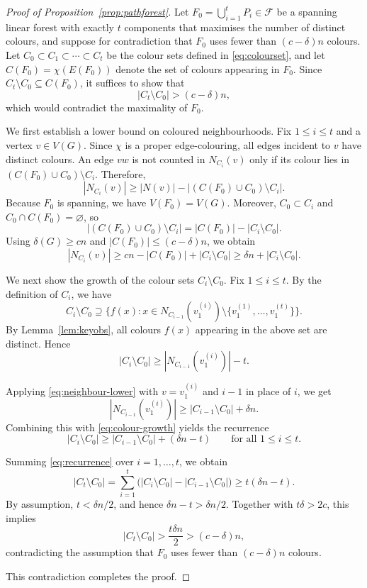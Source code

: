 \documentclass[10pt,a4paper]{amsart}
\renewcommand\ge{\geqslant}
\renewcommand\le{\leqslant}
\begin{document}
\begin{proof}[Proof of Proposition~\ref{prop:pathforest}]
Let $F_0=\bigcup_{i=1}^t P_i\in\mathcal F$ be a spanning linear forest with exactly $t$
components that maximises the number of distinct colours, and suppose for
contradiction that $F_0$ uses fewer than $(c-\delta)n$ colours.
Let $C_0\subset C_1\subset\cdots\subset C_t$ be the colour sets defined in
\eqref{eq:colourset}, and let $C(F_0)=\chi(E(F_0))$ denote the set of colours appearing
in $F_0$.
Since $C_t\setminus C_0\subseteq C(F_0)$, it suffices to show that
\[
|C_t\setminus C_0|>(c-\delta)n,
\]
which would contradict the maximality of $F_0$.

We first establish a lower bound on coloured neighbourhoods. Fix $1\le i\le t$ and a vertex $v\in V(G)$.
Since $\chi$ is a proper edge-colouring, all edges incident to $v$ have distinct
colours.
An edge $vw$ is not counted in $N_{C_i}(v)$ only if its colour lies in
$(C(F_0)\cup C_0)\setminus C_i$.
Therefore,
\[
|N_{C_i}(v)|
\ge |N(v)| - |(C(F_0)\cup C_0)\setminus C_i|.
\]
Because $F_0$ is spanning, we have $V(F_0)=V(G)$.
Moreover, $C_0\subset C_i$ and $C_0\cap C(F_0)=\varnothing$, so
\[
|(C(F_0)\cup C_0)\setminus C_i|
=|C(F_0)|-|C_i\setminus C_0|.
\]
Using $\delta(G)\ge cn$ and $|C(F_0)|\le(c-\delta)n$, we obtain
\begin{equation}\label{eq:neighbour-lower}
|N_{C_i}(v)|\ge cn-|C(F_0)|+|C_i\setminus C_0|
\ge \delta n+|C_i\setminus C_0|.
\end{equation}

We next show the growth of the colour sets $C_i\setminus C_0$.
Fix $1\le i\le t$.
By the definition of $C_i$, we have
\[
C_i\setminus C_0
\supseteq
\Big\{f(x):x\in N_{C_{i-1}}(v_1^{(i)})\setminus\{v_1^{(1)},\ldots,v_1^{(t)}\}\Big\}.
\]
By Lemma~\ref{lem:keyobs}, all colours $f(x)$ appearing in the above set are distinct.
Hence
\begin{equation}\label{eq:colour-growth}
|C_i\setminus C_0|
\ge |N_{C_{i-1}}(v_1^{(i)})|-t.
\end{equation}

Applying \eqref{eq:neighbour-lower} with $v=v_1^{(i)}$ and $i-1$ in place of $i$, we get
\[
|N_{C_{i-1}}(v_1^{(i)})|
\ge |C_{i-1}\setminus C_0|+\delta n.
\]
Combining this with \eqref{eq:colour-growth} yields the recurrence
\begin{equation}\label{eq:recurrence}
|C_i\setminus C_0|
\ge |C_{i-1}\setminus C_0|+(\delta n-t)
\qquad\text{for all }1\le i\le t.
\end{equation}

Summing \eqref{eq:recurrence} over $i=1,\ldots,t$, we obtain
\[
|C_t\setminus C_0|
=\sum_{i=1}^t\big(|C_i\setminus C_0|-|C_{i-1}\setminus C_0|\big)
\ge t(\delta n-t).
\]
By assumption, $t<\delta n/2$, and hence $\delta n-t>\delta n/2$.
Together with $t\delta>2c$, this implies
\[
|C_t\setminus C_0|
> \frac{t\delta n}{2}
> (c-\delta)n,
\]
contradicting the assumption that $F_0$ uses fewer than $(c-\delta)n$ colours.

This contradiction completes the proof.
\end{proof}
\end{document}
